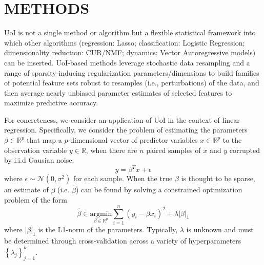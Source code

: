 \documentclass[letterpaper, 10 pt, conference]{ieeeconf}  %
\begin{document}
\section{METHODS}
UoI is not a single method or algorithm but a flexible statistical framework into which other algorithms (regression: Lasso; classification: Logistic Regression; dimensionality reduction: CUR/NMF; dynamics: Vector Autoregressive models) can be inserted. UoI-based methods leverage stochastic data resampling and a range of sparsity-inducing regularization parameters/dimensions to build families of potential feature sets robust to resamples (i.e., perturbations) of the data, and then average nearly unbiased parameter estimates of selected features to maximize predictive accuracy.

For concreteness, we consider an application of UoI in the context of linear regression. Specifically, we consider the problem of estimating the parameters $\beta \in \mathbb{R}^p$ that map a $p$-dimensional vector of predictor variables $x \in \mathbb{R}^p$ to the observation variable $y\in \mathbb{R}$, when there are $n$ paired samples of $x$ and $y$ corrupted by i.i.d Gausian noise:
$$
y = \beta^T x + \epsilon
$$
where $\epsilon \sim \mathcal{N}(0, \sigma^2)$ for each sample. When the true $\beta$ is thought to be sparse, an estimate of $\beta$ (i.e. $\hat{\beta}$) can be found by solving a constrained optimization problem of the form
$$
\hat{\beta} \in \underset{\beta\in \mathbb{R}^p}{\text{argmin}} \sum_{i=1}^n(y_i - \beta x_i)^2 + \lambda |\beta|_1
$$
where $|\beta|_1$ is the L1-norm of the parameters. Typically, $\lambda$ is unknown and must be determined through cross-validation across a variety of hyperparameters $\left\{\lambda_j\right\}_{j=1}^k$.
\end{document}
